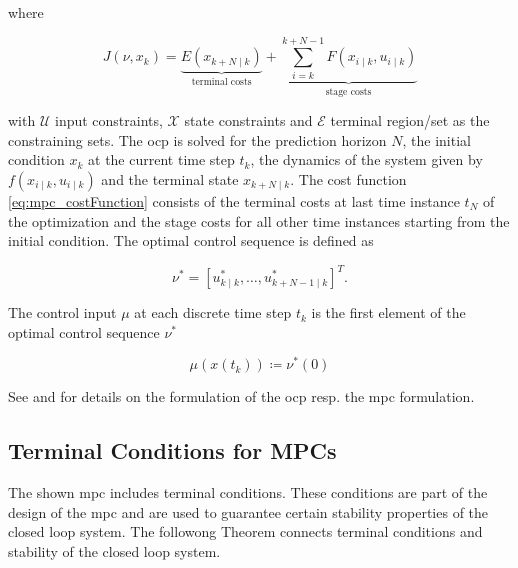 \documentclass[10pt,a4paper,titlepage]{article}
\begin{document}
where

\begin{equation}
\label{eq:mpc_costFunction}
    J\left(\nu, x_k\right)=\underbrace{E\left(x_{k+N \mid k}\right)}_{\text{terminal costs}} + \underbrace{\sum_{i=k}^{k+N-1} F\left(x_{i \mid k}, u_{i \mid k}\right)}_{\text{stage costs}}
\end{equation}

with $\mathcal{U}$ input constraints,  $\mathcal{X}$ state constraints and $\mathcal{E}$ terminal region/set as the constraining sets.
The \gls{ocp} is solved for the prediction horizon $N$, the initial condition $x_k$ at the current time step $t_k$, the dynamics
of the system given by $f\left(x_{i \mid k}, u_{i \mid k}\right)$ and the terminal state $x_{k+N \mid k}$. The cost function \eqref{eq:mpc_costFunction}
consists of the terminal costs at last time instance $t_N$ of the optimization and the stage costs for all other time instances starting from
the initial condition. The optimal control sequence is defined as

\begin{equation}
	\nu^* = [u_{k \mid k}^*, \dots , u_{k+N-1\mid k}^*]^T.
\end{equation}

The control input $\mu$ at each discrete time step $t_k$ is the first element of the optimal control sequence $\nu^*$

\begin{equation}
\mu(x(t_k)) \coloneqq \nu^*(0)
\end{equation}

See \cite{nmpcBible} and \cite{RaffAllgoewer} for details on the formulation of the \gls{ocp} resp. the \gls{mpc} formulation.

\subsection{Terminal Conditions for MPCs}
The shown \gls{mpc} includes terminal conditions. These conditions are part of the design of the \gls{mpc} and are used to
guarantee certain stability properties of the closed loop system. The followong Theorem connects terminal conditions and
stability of the closed loop system. \cite{RaffAllgoewer}
\end{document}
